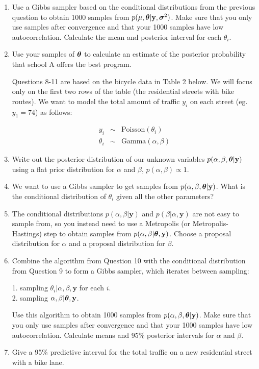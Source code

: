 \documentclass[12pt]{article}
\def\y{\mathbf{y}}
\newcommand{\si}{\mbox{\boldmath $\sigma$}}
\newcommand{\bth}{\mbox{\boldmath $\theta$}}
\begin{document}
\begin{enumerate}
	\item Use a Gibbs sampler based on the conditional distributions from the previous question to obtain 1000 samples from $p(\mu,\bth|\y,\si^2)$. Make sure that you only use samples after convergence and that your 1000 samples have low autocorrelation. Calculate the mean and posterior interval for each $\theta_i$.
	
	\item Use your samples of $\bth$ to calculate an estimate of the posterior probability that school A offers the best program.
	
	\vspace{.05cm} Questions 8-11 are based on the bicycle data in Table 2 below. We will focus only on the first two rows of the table (the residential streets with bike routes). We want to model the total amount of traffic $y_i$ on each street (eg. $y_1=74$) as follows:
	
	\begin{eqnarray*}
		y_i & \sim & \mbox{Poisson}(\theta_i)\\
		\theta_i & \sim & \mbox{Gamma}(\alpha,\beta) 
	\end{eqnarray*}
	
	\item Write out the posterior distribution of our unknown variables $p(\alpha,\beta,\bth|\y)$ using a flat prior distribution for $\alpha$ and $\beta$, $p(\alpha,\beta) \propto 1$.
	
	\item We want to use a Gibbs sampler to get samples from $p(\alpha,\beta,\bth|\y)$. What is the conditional distribution of $\theta_i$ given all the other parameters?
	
	\item The conditional distributions $p(\alpha,\beta|\y)$ and $p(\beta|\alpha,\y)$ are not easy to sample from, so you instead need to use a Metropolis (or Metropolis-Hastings) step to obtain samples from $p(\alpha,\beta|\bth,\y)$. Choose a proposal distribution for $\alpha$ and a proposal distribution for $\beta$.
	
	\item Combine the algorithm from Question 10 with the conditional distribution from Question 9 to form a Gibbs sampler, which iterates between sampling:
	
	1. sampling $\theta_i | \alpha,\beta,\y$ for each $i$.\\
	2. sampling $\alpha,\beta|\bth,\y$.
	
	Use this algorithm to obtain 1000 samples from $p(\alpha,\beta,\bth|\y)$. Make sure that you only use samples after convergence and that your 1000 samples have low autocorrelation. Calculate means and 95\% posterior intervals for $\alpha$ and $\beta$.
	
	\item Give a 95\% predictive interval for the total traffic on a new residential street with a bike lane. 
\end{enumerate}
\end{document}
